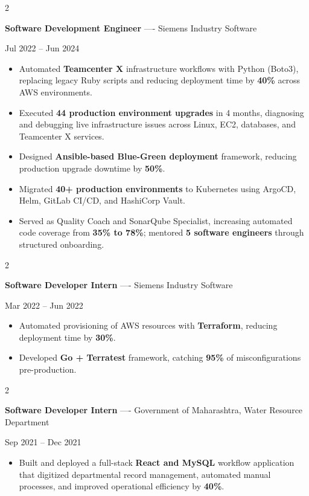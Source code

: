 \documentclass[10pt, letterpaper]{article}
\newenvironment{highlights}{
    \begin{itemize}[
        topsep=0.10 cm,
        parsep=0.06 cm,
        partopsep=0pt,
        itemsep=0.06 cm,
        leftmargin=12pt
    ]
}{
    \end{itemize}
}
\newenvironment{twocolentry}[2][]{
    \onecolentry
    \def\secondColumn{#2}
    \setcolumnwidth{\fill, 4.5 cm}
    \begin{paracol}{2}
}{
    \switchcolumn \raggedleft \secondColumn
    \end{paracol}
    \endonecolentry
}
\begin{document}
\vspace{0.15 cm}

\begin{twocolentry}{Jul 2022 -- Jun 2024}
\textbf{Software Development Engineer} ---- Siemens Industry Software
\end{twocolentry}
\begin{highlights}
  \item Automated \textbf{Teamcenter X} infrastructure workflows with Python (Boto3), replacing legacy Ruby scripts and reducing deployment time by \textbf{40\%} across AWS environments.
  \item Executed \textbf{44 production environment upgrades} in 4 months, diagnosing and debugging live infrastructure issues across Linux, EC2, databases, and Teamcenter X services.
  \item Designed \textbf{Ansible-based Blue-Green deployment} framework, reducing production upgrade downtime by \textbf{50\%}.
  \item Migrated \textbf{40+ production environments} to Kubernetes using ArgoCD, Helm, GitLab CI/CD, and HashiCorp Vault.
  \item Served as Quality Coach and SonarQube Specialist, increasing automated code coverage from \textbf{35\% to 78\%}; mentored \textbf{5 software engineers} through structured onboarding.
\end{highlights}

\vspace{0.15 cm}

\begin{twocolentry}{Mar 2022 -- Jun 2022}
\textbf{Software Developer Intern} ---- Siemens Industry Software
\end{twocolentry}
\begin{highlights}
  \item Automated provisioning of AWS resources with \textbf{Terraform}, reducing deployment time by \textbf{30\%}.
  \item Developed \textbf{Go + Terratest} framework, catching \textbf{95\%} of misconfigurations pre-production.
\end{highlights}

\vspace{0.15 cm}

\begin{twocolentry}{Sep 2021 -- Dec 2021}
\textbf{Software Developer Intern} ---- Government of Maharashtra, Water Resource Department
\end{twocolentry}
\begin{highlights}
  \item Built and deployed a full-stack \textbf{React and MySQL} workflow application that digitized departmental record management, automated manual processes, and improved operational efficiency by \textbf{40\%}.
\end{highlights}
\end{document}
